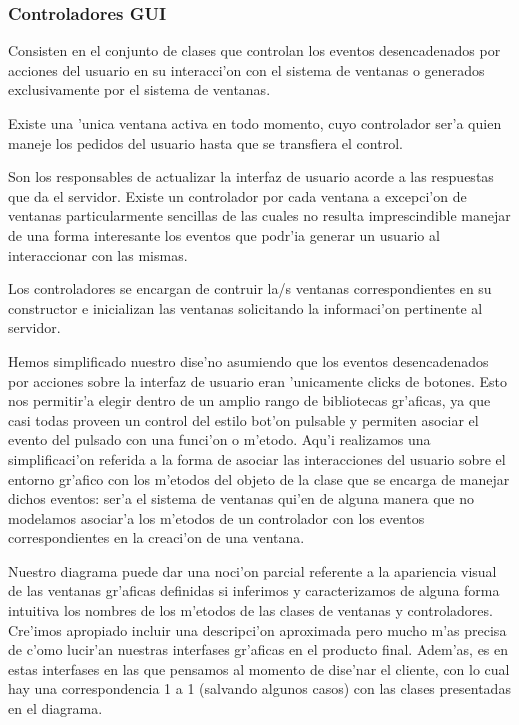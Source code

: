 \subsubsection{Controladores GUI}
Consisten en el conjunto de clases que controlan los eventos desencadenados por acciones del usuario en su interacci'on con el sistema de ventanas o generados exclusivamente por el sistema de ventanas.

Existe una 'unica ventana activa en todo momento, cuyo controlador ser'a quien maneje los pedidos del usuario hasta que se transfiera el control.

Son los responsables de actualizar la interfaz de usuario acorde a las respuestas que da el servidor. Existe un controlador por cada ventana a excepci'on de ventanas particularmente sencillas de las cuales no resulta imprescindible manejar de una forma interesante los eventos que podr'ia generar un usuario al interaccionar con las mismas.

Los controladores se encargan de contruir la/s ventanas correspondientes en su constructor e inicializan las ventanas solicitando la informaci'on pertinente al servidor.

Hemos simplificado nuestro dise'no asumiendo que los eventos desencadenados por acciones sobre la interfaz de usuario eran 'unicamente clicks de botones. Esto nos permitir'a elegir dentro de un amplio rango de bibliotecas gr'aficas, ya que casi todas proveen un control del estilo bot'on pulsable y permiten asociar el evento del pulsado con una funci'on o m'etodo. Aqu'i realizamos una simplificaci'on referida a la forma de asociar las interacciones del usuario sobre el entorno gr'afico con los m'etodos del objeto de la clase que se encarga de manejar dichos eventos: ser'a el sistema de ventanas qui'en de alguna manera que no modelamos asociar'a los m'etodos de un controlador con los eventos correspondientes en la creaci'on de una ventana.

Nuestro diagrama puede dar una noci'on parcial referente a la apariencia visual de las ventanas gr'aficas definidas si inferimos y caracterizamos de alguna forma intuitiva los nombres de los m'etodos de las clases de ventanas y controladores. Cre'imos apropiado incluir una descripci'on aproximada pero mucho m'as precisa de c'omo lucir'an nuestras interfases gr'aficas en el producto final. Adem'as, es en estas interfases en las que pensamos al momento de dise'nar el cliente, con lo cual hay una correspondencia 1 a 1 (salvando algunos casos) con las clases presentadas en el diagrama.

